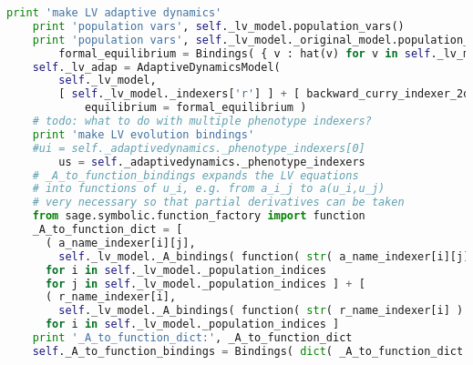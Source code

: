 \begin{lstlisting}[language=Python]
	print 'make LV adaptive dynamics'
	print 'population vars', self._lv_model.population_vars()
	print 'population vars', self._lv_model._original_model.population_vars()
        formal_equilibrium = Bindings( { v : hat(v) for v in self._lv_model.population_vars() } )
	self._lv_adap = AdaptiveDynamicsModel(
	    self._lv_model,
	    [ self._lv_model._indexers['r'] ] + [ backward_curry_indexer_2d(self._lv_model._indexers['a'])[j] for j in self._lv_model._population_indices ],
            equilibrium = formal_equilibrium )
	# todo: what to do with multiple phenotype indexers?
	print 'make LV evolution bindings'
	#ui = self._adaptivedynamics._phenotype_indexers[0]
        us = self._adaptivedynamics._phenotype_indexers
	# _A_to_function_bindings expands the LV equations
	# into functions of u_i, e.g. from a_i_j to a(u_i,u_j)
	# very necessary so that partial derivatives can be taken
	from sage.symbolic.function_factory import function
	_A_to_function_dict = [
	  ( a_name_indexer[i][j], 
	    self._lv_model._A_bindings( function( str( a_name_indexer[i][j] ) )( *([u[i] for u in us] + [u[j] for u in us] ) ) ) )
	  for i in self._lv_model._population_indices
	  for j in self._lv_model._population_indices ] + [
	  ( r_name_indexer[i],
	    self._lv_model._A_bindings( function( str( r_name_indexer[i] ) )( *(u[i] for u in us) ) ) )
	  for i in self._lv_model._population_indices ]
	print '_A_to_function_dict:', _A_to_function_dict
	self._A_to_function_bindings = Bindings( dict( _A_to_function_dict ) )


\end{lstlisting}
